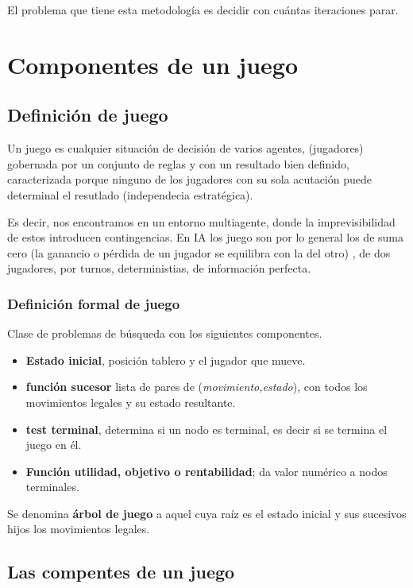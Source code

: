\documentclass[12 pt, a4paper]{article}
\begin{document}
El problema que tiene esta metodología es decidir con cuántas iteraciones parar. 

\newpage

\section{Componentes de un juego}
\subsection{Definición de juego}

Un juego es cualquier situación de decisión de varios agentes, (jugadores)
gobernada por un conjunto de reglas y con un resultado bien definido, caracterizada porque ninguno de los 
jugadores con su sola acutación puede determinal el resutlado (independecia estratégica). 

Es decir, nos encontramos en un entorno multiagente, donde la imprevisibilidad de estos introducen 
contingencias. En IA los juego son por lo general los de suma cero (la ganancio o pérdida de un jugador se equilibra con la del otro)
, de dos jugadores, por turnos, deterministias,
de información perfecta. 
\subsubsection{Definición formal de juego}
Clase de problemas de búsqueda con los siguientes componentes. 

\begin{itemize}
  \item \textbf{Estado inicial}, posición tablero y el jugador que mueve.
  \item \textbf{función sucesor} lista de pares de (\textit{movimiento,estado}), con todos los movimientos legales y su estado resultante. 
  \item \textbf{test terminal}, determina si un nodo es terminal, es decir si se termina el juego en él. 
  \item \textbf{Función utilidad, objetivo o rentabilidad}; da valor numérico a nodos terminales.
\end{itemize}

Se denomina \textbf{árbol de juego} a aquel cuya raíz es el estado inicial y sus sucesivos hijos los movimientos legales. 

\subsection{Las compentes de un juego}
\end{document}
